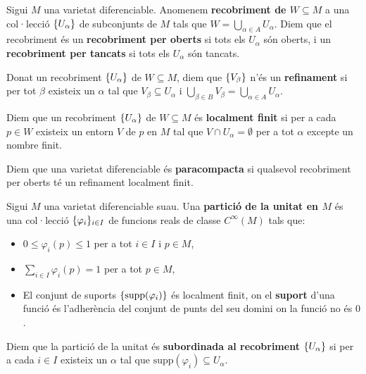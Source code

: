 \begin{defi}
    Sigui $M$ una varietat diferenciable. Anomenem \textbf{recobriment de $W\subseteq M$} a una col·lecció $\{U_\alpha\}$ de subconjunts de $M$ tals que $W = \bigcup_{\alpha\in A} U_\alpha$. Diem que el recobriment és un \textbf{recobriment per oberts} si tots els $U_\alpha$ són oberts, i un \textbf{recobriment per tancats} si tots els $U_\alpha$ són tancats.

    Donat un recobriment $\{U_\alpha\}$ de $W\subseteq M$, diem que $\{V_\beta\}$ n'és un \textbf{refinament} si per tot $\beta$ existeix un $\alpha$ tal que $V_\beta\subseteq U_\alpha$ i $\bigcup_{\beta\in B} V_\beta = \bigcup_{\alpha\in A} U_\alpha$.

    Diem que un recobriment $\{U_\alpha\}$ de $W\subseteq M$ és \textbf{localment finit} si per a cada $p\in W$ existeix un entorn $V$ de $p$ en $M$ tal que $V\cap U_\alpha = \emptyset$ per a tot $\alpha$ excepte un nombre finit. 
    
    Diem que una varietat diferenciable és \textbf{paracompacta} si qualsevol recobriment per oberts té un refinament localment finit.
\end{defi}

\begin{defi}
    Sigui $M$ una varietat diferenciable suau. Una \textbf{partició de la unitat en $M$} és una col·lecció $\{\varphi_i\}_{i\in I}$ de funcions reals de classe $C^\infty(M)$ tals que:
    \begin{itemize}
        \item $0\leq\varphi_i(p)\leq 1$ per a tot $i\in I$ i $p\in M$,
        \item $\sum_{i\in I}\varphi_i(p) = 1$ per a tot $p\in M$,
        \item El conjunt de suports $\{\text{supp}(\varphi_i)\}$ és localment finit, on el \textbf{suport} d'una funció és l'adherència del conjunt de punts del seu domini on la funció no és $0$.
    \end{itemize}
    Diem que la partició de la unitat és \textbf{subordinada al recobriment} $\{U_\alpha\}$ si per a cada $i\in I$ existeix un $\alpha$ tal que $\text{supp}(\varphi_i)\subseteq U_\alpha$.
\end{defi}

